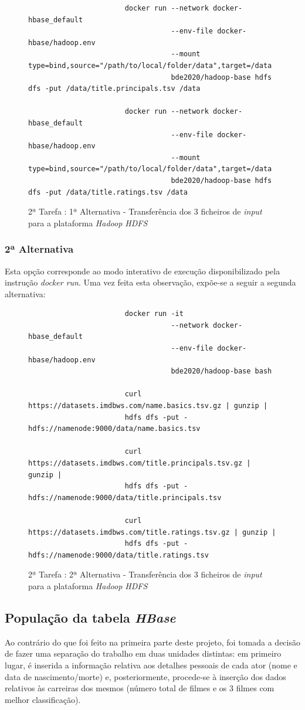 \documentclass[a4paper]{report}
\begin{document}
{\begin{figure}[H]
{\begin{verbatim}
					   docker run --network docker-hbase_default
					              --env-file docker-hbase/hadoop.env
					              --mount type=bind,source="/path/to/local/folder/data",target=/data
					              bde2020/hadoop-base hdfs dfs -put /data/title.principals.tsv /data
								  
					   docker run --network docker-hbase_default
					              --env-file docker-hbase/hadoop.env
					              --mount type=bind,source="/path/to/local/folder/data",target=/data
					              bde2020/hadoop-base hdfs dfs -put /data/title.ratings.tsv /data
					\end{verbatim}
				}
				\caption{2ª Tarefa : 1ª Alternativa - Transferência dos 3 ficheiros de \textit{input} para a plataforma \textit{Hadoop HDFS}}
				\label{fig:16}
			\end{figure}

			\subsubsection{2ª Alternativa}
			Esta opção corresponde ao modo interativo de execução disponibilizado pela instrução \textit{docker run}.
			Uma vez feita esta observação, expõe-se a seguir a segunda alternativa:
			\begin{figure}[H]
				{
					\color{teal}
					\begin{verbatim}
					   docker run -it
					              --network docker-hbase_default
					              --env-file docker-hbase/hadoop.env
					              bde2020/hadoop-base bash

					   curl https://datasets.imdbws.com/name.basics.tsv.gz | gunzip |
					   hdfs dfs -put - hdfs://namenode:9000/data/name.basics.tsv

					   curl https://datasets.imdbws.com/title.principals.tsv.gz | gunzip |
					   hdfs dfs -put - hdfs://namenode:9000/data/title.principals.tsv

					   curl https://datasets.imdbws.com/title.ratings.tsv.gz | gunzip |
					   hdfs dfs -put - hdfs://namenode:9000/data/title.ratings.tsv
					\end{verbatim}
				}
				\caption{2ª Tarefa : 2ª Alternativa - Transferência dos 3 ficheiros de \textit{input} para a plataforma \textit{Hadoop HDFS}}
				\label{fig:17}
			\end{figure}

		\subsection{População da tabela \textit{HBase}} \label{subsec:Task2-3}
			Ao contrário do que foi feito na primeira parte deste projeto, foi tomada a decisão de fazer uma separação do trabalho em duas unidades distintas: em primeiro lugar, é inserida a informação relativa aos detalhes pessoais de cada ator (nome e data de nascimento/morte) e, posteriormente, procede-se à inserção dos dados relativos às carreiras dos mesmos (número total de filmes e os 3 filmes com melhor classificação).
			
}
\end{document}
